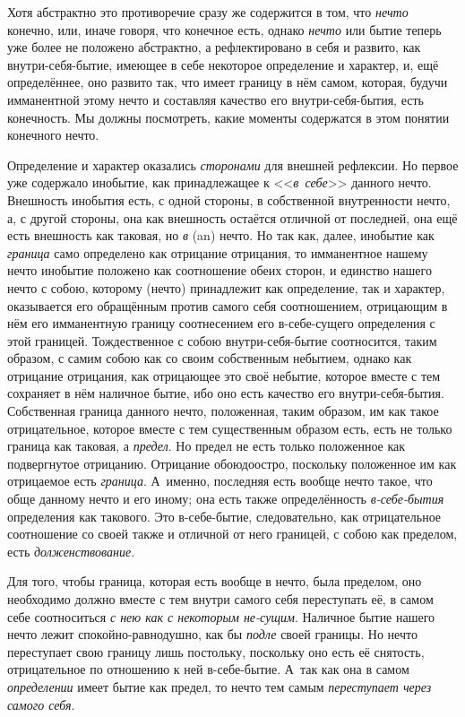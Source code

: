 \bigskip


Хотя абстрактно это противоречие сразу же содержится в том, что
{\em нечто} конечно, или, иначе говоря, что конечное
есть, однако {\em нечто} или бытие теперь уже более не
положено абстрактно, а рефлектировано в себя и развито, как
внутри-себя-бытие, имеющее в себе некоторое определение и характер, и, ещё
определённее, оно развито так, что имеет границу в нём самом, которая,
будучи имманентной этому нечто и составляя качество его внутри-себя-бытия,
есть конечность. Мы должны посмотреть, какие моменты содержатся в этом
понятии конечного нечто.

Определение и характер оказались {\em сторонами} для
внешней рефлексии. Но первое уже содержало инобытие, как принадлежащее к
<<{\em в~себе}>> данного нечто. Внешность инобытия есть,
с одной стороны, в собственной внутренности нечто, а, с другой стороны, она
как внешность остаётся отличной от последней, она ещё есть внешность как
таковая, но {\em в} (an) нечто. Но так как, далее,
инобытие как {\em граница} само определено как
отрицание отрицания, то имманентное нашему нечто инобытие положено как
соотношение обеих сторон, и единство нашего нечто с собою, которому (нечто)
принадлежит как определение, так и характер, оказывается его обращённым
против самого себя соотношением, отрицающим в нём его имманентную границу
соотнесением его в-себе-сущего определения с этой границей. Тождественное с
собою внутри-себя-бытие соотносится, таким образом, с самим собою как со
своим собственным небытием, однако как отрицание отрицания, как отрицающее
это своё небытие, которое вместе с тем сохраняет в нём наличное бытие, ибо
оно есть качество его внутри-себя-бытия. Собственная граница данного нечто,
положенная, таким образом, им как такое отрицательное, которое вместе с тем
существенным образом есть, есть не только граница как таковая, а
{\em предел}. Но предел не есть только положенное как
подвергнутое отрицанию. Отрицание обоюдоостро, поскольку положенное им как
отрицаемое есть {\em граница}. А~именно, последняя есть
вообще нечто такое, что обще данному нечто и его иному; она есть также
определённость {\em в-себе-бытия} определения как
такового. Это в-себе-бытие, следовательно, как отрицательное соотношение со
своей также и отличной от него границей, с собою как пределом, есть
{\em долженствование}.

Для того, чтобы граница, которая есть вообще в нечто, была пределом, оно
необходимо должно вместе с тем внутри самого себя переступать её, в самом
себе соотноситься {\em с нею как с некоторым не-сущим}.
Наличное бытие нашего нечто лежит спокойно-равнодушно, как бы
{\em подле} своей границы. Но нечто переступает свою
границу лишь постольку, поскольку оно есть её снятость, отрицательное по
отношению к ней в-себе-бытие. А~так как она в самом
{\em определении} имеет бытие как предел, то нечто тем
самым {\em переступает через самого себя}.

